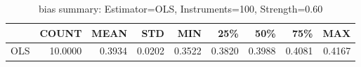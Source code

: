 \begin{table}[ht]
\centering
\caption{bias summary: Estimator=OLS, Instruments=100, Strength=0.60}
\begin{tabular}{lrrrrrrrr}
\toprule
 & COUNT & MEAN & STD & MIN & 25\% & 50\% & 75\% & MAX \\
\midrule
OLS & 10.0000 & 0.3934 & 0.0202 & 0.3522 & 0.3820 & 0.3988 & 0.4081 & 0.4167 \\
\bottomrule
\end{tabular}
\end{table}
